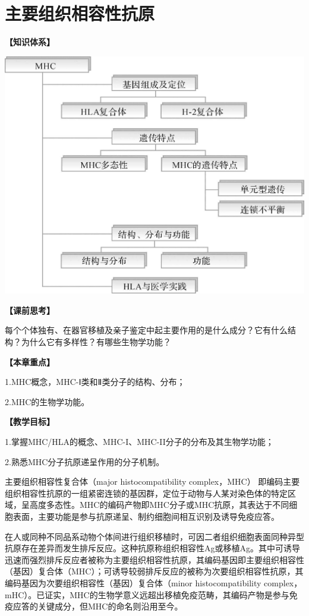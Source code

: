 \chapter{主要组织相容性抗原}
\begin{framed}
\noindent\textbf{【知识体系】}
\begin{center}
\includegraphics{./images/Image00101.jpg}
\end{center}
\noindent\textbf{【课前思考】}

每个个体独有、在器官移植及亲子鉴定中起主要作用的是什么成分？它有什么结构？为什么它有多样性？有哪些生物学功能？

\noindent\textbf{【本章重点】}

1.MHC概念，MHC-Ⅰ类和Ⅱ类分子的结构、分布；

2.MHC的生物学功能。

\noindent\textbf{【教学目标】}

1.掌握MHC/HLA的概念、MHC-I、MHC-II分子的分布及其生物学功能；

2.熟悉MHC分子抗原递呈作用的分子机制。
\end{framed}

主要组织相容性复合体（major histocompatibility complex，MHC）
即编码主要组织相容性抗原的一组紧密连锁的基因群，定位于动物与人某对染色体的特定区域，呈高度多态性。MHC的编码产物即MHC分子或MHC抗原，其表达于不同细胞表面，主要功能是参与抗原递呈、制约细胞间相互识别及诱导免疫应答。

在人或同种不同品系动物个体间进行组织移植时，可因二者组织细胞表面同种异型抗原存在差异而发生排斥反应。这种抗原称组织相容性Ag或移植Ag。其中可诱导迅速而强烈排斥反应者被称为主要组织相容性抗原，其编码基因即主要组织相容性（基因）复合体（MHC）；可诱导较弱排斥反应的被称为次要组织相容性抗原，其编码基因为次要组织相容性（基因）复合体（minor
histocompatibility
complex，mHC）。已证实，MHC的生物学意义远超出移植免疫范畴，其编码产物是参与免疫应答的关键成分，但MHC的命名则沿用至今。

